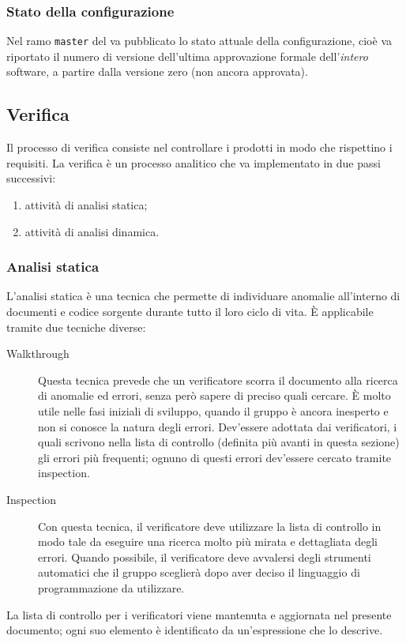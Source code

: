\subsubsection{Stato della configurazione}
Nel ramo \texttt{master} del  va pubblicato lo stato attuale della configurazione, cioè va riportato il numero di versione dell'ultima approvazione formale dell'\emph{intero} software, a partire dalla versione zero (non ancora approvata).






\subsection{Verifica}
Il processo di verifica consiste nel controllare i prodotti in modo che rispettino i requisiti. %
La verifica è un processo analitico che va implementato in due passi successivi:
\begin{enumerate}
	\item attività di analisi statica;
	\item attività di analisi dinamica.
\end{enumerate}

	\subsubsection{Analisi statica}
	L'analisi statica è una tecnica che permette di individuare anomalie all'interno di documenti e codice sorgente durante tutto il loro ciclo di vita. È applicabile tramite due tecniche diverse:
	\begin{description}
		\item[Walkthrough] Questa tecnica prevede che un verificatore scorra il documento alla ricerca di anomalie ed errori, senza però sapere di preciso quali cercare. È molto utile nelle fasi iniziali di sviluppo, quando il gruppo è ancora inesperto e non si conosce la natura degli errori. Dev'essere adottata dai verificatori, i quali scrivono nella lista di controllo (definita più avanti in questa sezione) gli errori più frequenti; ognuno di questi errori dev'essere cercato tramite inspection.
		\item[Inspection] Con questa tecnica, il verificatore deve utilizzare la lista di controllo in modo tale da eseguire una ricerca molto più mirata e dettagliata degli errori. Quando possibile, il verificatore deve avvalersi degli strumenti automatici che il gruppo sceglierà dopo aver deciso il linguaggio di programmazione da utilizzare.
	\end{description}
	La lista di controllo per i verificatori viene mantenuta e aggiornata nel presente documento; ogni suo elemento è identificato da un'espressione che lo descrive.
